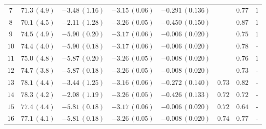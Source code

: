\begin{center}
\begin{longtable}{@{\extracolsep{\fill}}cccccccc@{}}

$7$ & $71.3\,(4.9)$& $-3.48\,(1.16)$ & $-3.15\,(0.06)$& $-0.291\,(0.136)$ & $ $ & $ 0.77 $ & $ 1 $ \\
 
$8$ & $70.1\,(4.5)$& $-2.11\,(1.28)$ & $-3.26\,(0.05)$& $-0.450\,(0.150)$ & $ $ & $ 0.87 $ & $ 1 $ \\	
  
$9$ & $74.5\,(4.9)$& $-5.90\,(0.20)$& $-3.17\,(0.06)$& $-0.006\,(0.020)$ & $ $ & $ 0.75 $ & $ 1 $ \\

$10$ & $74.4\,(4.0)$& $-5.90\,(0.18)$& $-3.17\,(0.06)$& $-0.006\,(0.020)$& $ $ & $ 0.78 $ & - \\

$11$ & $75.0\,(4.8)$& $-5.87\,(0.20)$& $-3.26\,(0.05)$& $-0.008\,(0.020)$ & $ $ & $ 0.76 $ & $ 1 $ \\
   
$12$ & $74.7\,(3.8)$& $-5.87\,(0.18)$& $-3.26\,(0.05)$& $-0.008\,(0.020)$& $ $ & $ 0.73 $ & - \\


$13$ & $78.1\,(4.4)$& $-3.44\,(1.25)$ & $-3.16\,(0.06)$& $-0.272\,(0.140)$ & $ 0.73 $ & $ 0.82 $ & - \\

 
$14$ & $78.3\,(4.2)$& $-2.08\,(1.19)$ & $-3.26\,(0.05)$& $-0.426\,(0.133)$ & $ 0.72 $ & $ 0.72 $ & -\\

  
$15$ & $77.4\,(4.4)$& $-5.81\,(0.18)$& $-3.17\,(0.06)$& $-0.006\,(0.020)$ & $ 0.72 $ & $ 0.64 $ & - \\


$16$ & $77.1\,(4.1)$& $-5.81\,(0.18)$& $-3.26\,(0.05)$& $-0.008\,(0.020)$ & $ 0.74 $ & $ 0.77 $ & - \\
   


\end{longtable}
\end{center}
